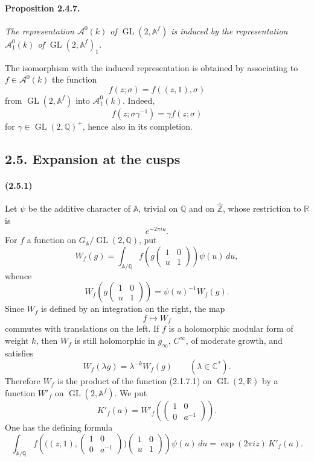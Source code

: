 \documentclass[10pt,a4paper]{article}
\providecommand{\GL}{\operatorname{GL}}
\providecommand{\R}{\mathbb R}
\providecommand{\Q}{\mathbb Q}
\providecommand{\Z}{\mathbb Z}
\providecommand{\C}{\mathbb C}
\providecommand{\A}{\mathbb A}
\providecommand{\Af}{\mathbb A^f}
\begin{document}
\paragraph{Proposition 2.4.7.}{\itshape  The representation \(\mathcal A^0(k)\) of \(\GL(2,\Af)\) is induced by the representation \(\mathcal A_1^0(k)\) of \(\GL(2,\Af)_1\).\par}

The isomorphism with the induced representation is obtained by associating to \(f\in \mathcal A^0(k)\) the function
\[
f(z;\sigma)=f((z,1),\sigma)
\]
from \(\GL(2,\Af)\) into \(\mathcal A_1^0(k)\). Indeed,
\[
f(z;\sigma\gamma^{-1})=\gamma f(z;\sigma)
\]
for \(\gamma\in\GL(2,\Q)^+\), hence also in its completion.

\clearpage
{}
\hypertarget{authority-34}{}
\subsection*{2.5. Expansion at the cusps}

\paragraph{(2.5.1)} Let \(\psi\) be the additive character of \(\A\), trivial on \(\Q\) and on \(\widehat{\Z}\), whose restriction to \(\R\) is
\[
e^{-2\pi iu}.
\]
For \(f\) a function on \(G_{\A}/\GL(2,\Q)\), put
\[
W_f(g)=
\int_{\A/\Q}
f\!\left(g\begin{pmatrix}1&0\\ u&1\end{pmatrix}\right)\psi(u)\,du,
\]
whence
\[
W_f\!\left(g\begin{pmatrix}1&0\\ u&1\end{pmatrix}\right)
=
\psi(u)^{-1}W_f(g).
\]
Since \(W_f\) is defined by an integration on the right, the map
\[
f\longmapsto W_f
\]
commutes with translations on the left. If \(f\) is a holomorphic modular form of weight \(k\), then \(W_f\) is still holomorphic in \(g_\infty\), \(C^\infty\), of moderate growth, and satisfies
\[
W_f(\lambda g)=\lambda^{-k}W_f(g)
\qquad(\lambda\in\C^*).
\]
Therefore \(W_f\) is the product of the function (2.1.7.1) on \(\GL(2,\R)\) by a function \(W'_f\) on \(\GL(2,\Af)\). We put
\[
K'_f(a)=
W'_f\!\left(\begin{pmatrix}1&0\\0&a^{-1}\end{pmatrix}\right).
\]
One has the defining formula
\[
\tag{2.5.1.1}
\int_{\A/\Q}
f\!\left(\bigl((z,1),
\begin{pmatrix}1&0\\0&a^{-1}\end{pmatrix}\bigr)
\begin{pmatrix}1&0\\u&1\end{pmatrix}\right)\psi(u)\,du
=
\exp(2\pi iz)\,K'_f(a).
\]
\end{document}
